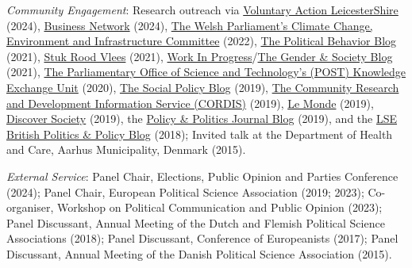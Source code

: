 \documentclass[letterpaper,fontsize=10.5pt]{scrartcl}
\begin{document}
{}\textit{Community Engagement}: Research outreach via \href{https://valonline.org.uk/future-focus-2024/}{Voluntary Action LeicesterShire} (2024), \href{https://issuu.com/kemps/docs/biz_network_april_2024/74}{Business Network} (2024), \href{https://senedd.wales/seneddclimate}{The Welsh Parliament's Climate Change, Environment and Infrastructure Committee} (2022), \href{https://tinyurl.com/4t6k26nh}{The Political Behavior Blog} (2021), \href{https://stukroodvlees.nl/meer-inspraak-minder-schuld/}{Stuk Rood Vlees} (2021), \href{http://www.wipsociology.org/2021/09/16/womens-work-and-the-welfare-state-new-analysis-quantifies-how-gender-class-and-social-policy-shape-unpaid-care-work/}{Work In Progress}/\href{https://gendersociety.wordpress.com/2021/09/03/womens-work-and-the-welfare-state-new-analysis-quantifies-how-gender-class-and-social-policy-shape-unpaid-care-work/}{The Gender \& Society Blog} (2021),  \href{https://www.lboro.ac.uk/media-centre/press-releases/2020/october/life-beyond-covid-19-loughborough-experts/}{The Parliamentary Office of Science and Technology's (POST) Knowledge Exchange Unit} (2020), \href{https://socialpolicyblog.com/2019/05/08/explaining-other-peoples-stances-on-inequality/}{The Social Policy Blog} (2019), \href{https://cordis.europa.eu/project/rcn/209009/brief/en}{The Community Research and Development Information Service (CORDIS)} (2019), \href{https://www.lemonde.fr/idees/article/2019/03/22/nous-demandons-des-programmes-sociaux-moins-genereux-lorsque-nos-revenus-diminuent_5439877_3232.html}{Le Monde} (2019), \href{https://archive.discoversociety.org/2019/02/06/policy-and-politics-one-of-us-how-welfare-states-help-shape-immigrant-integration/}{Discover Society} (2019), the \href{https://policyandpoliticsblog.com/2019/02/20/one-of-us-how-welfare-states-help-shape-immigrant-integration/}{Policy \& Politics Journal Blog} (2019), and the \href{http://blogs.lse.ac.uk/politicsandpolicy/how-claims-about-welfare-benefit-levels-affect-public-opinion/}{LSE British Politics \& Policy Blog} (2018); Invited talk at the Department of Health and Care, Aarhus Municipality, Denmark (2015).\\ 
\hfill \break
{}
{}\textit{External Service}: Panel Chair, Elections, Public Opinion and Parties Conference (2024); Panel Chair, European Political Science Association (2019; 2023); Co-organiser, Workshop on Political Communication and Public Opinion (2023); Panel Discussant, Annual Meeting of the Dutch and Flemish Political Science Associations (2018); Panel Discussant, Conference of Europeanists (2017); Panel Discussant, Annual Meeting of the Danish Political Science Association (2015).\\ 
\end{document}
